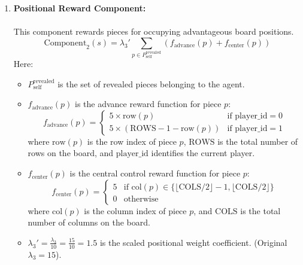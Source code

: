 \documentclass{article}
\begin{document}
\begin{enumerate}
    \item   \textbf{Positional Reward Component:}
            \\
            \\
            This component rewards pieces for occupying advantageous board positions.
            \begin{equation}
                \label{eq:positional_reward}
                \text{Component}_2(s) = \lambda_3' \sum_{p \in P_{\text{self}}^{\text{revealed}}} \left( f_{\text{advance}}(p) + f_{\text{center}}(p) \right)
            \end{equation}
            Here:
            \begin{itemize}
                \item $P_{\text{self}}^{\text{revealed}}$ is the set of revealed pieces belonging to the agent.
                \item $f_{\text{advance}}(p)$ is the advance reward function for piece $p$:
                \begin{equation}
                \label{eq:advance_reward}
                f_{\text{advance}}(p) = \begin{cases}
                5 \times \text{row}(p) & \text{if player\_id} = 0 \\
                5 \times (\text{ROWS} - 1 - \text{row}(p)) & \text{if player\_id} = 1
                \end{cases}
                \end{equation}
                where $\text{row}(p)$ is the row index of piece $p$, $\text{ROWS}$ is the total number of rows on the board, and $\text{player\_id}$ identifies the current player.
                \item $f_{\text{center}}(p)$ is the central control reward function for piece $p$:
                \begin{equation}
                \label{eq:center_reward}
                f_{\text{center}}(p) = \begin{cases}
                5 & \text{if col}(p) \in \{\lfloor \text{COLS}/2 \rfloor - 1, \lfloor \text{COLS}/2 \rfloor\} \\
                0 & \text{otherwise}
                \end{cases}
                \end{equation}
                where $\text{col}(p)$ is the column index of piece $p$, and $\text{COLS}$ is the total number of columns on the board.
                \item $\lambda_3' = \frac{\lambda_3}{10} = \frac{15}{10} = 1.5$ is the scaled positional weight coefficient. (Original $\lambda_3 = 15$).
            \end{itemize}


\end{enumerate}
\end{document}
